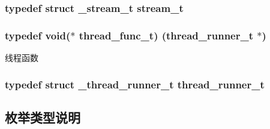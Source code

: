 \subsubsection[{stream\+\_\+t}]{\setlength{\rightskip}{0pt plus 5cm}typedef struct {\bf \+\_\+stream\+\_\+t} {\bf stream\+\_\+t}}\label{a00044_a261dba04f46f5c59a68a05f69f5a65a8_a261dba04f46f5c59a68a05f69f5a65a8}
\hypertarget{a00044_a46bcd8005e5d86fdbc6be5af0a77156c_a46bcd8005e5d86fdbc6be5af0a77156c}{}
\subsubsection[{thread\+\_\+func\+\_\+t}]{\setlength{\rightskip}{0pt plus 5cm}typedef void($\ast$ thread\+\_\+func\+\_\+t) ({\bf thread\+\_\+runner\+\_\+t} $\ast$)}\label{a00044_a46bcd8005e5d86fdbc6be5af0a77156c_a46bcd8005e5d86fdbc6be5af0a77156c}
线程函数 \hypertarget{a00044_a9054159cde2f926ef61c28ce1e555199_a9054159cde2f926ef61c28ce1e555199}{}
\subsubsection[{thread\+\_\+runner\+\_\+t}]{\setlength{\rightskip}{0pt plus 5cm}typedef struct {\bf \+\_\+thread\+\_\+runner\+\_\+t} {\bf thread\+\_\+runner\+\_\+t}}\label{a00044_a9054159cde2f926ef61c28ce1e555199_a9054159cde2f926ef61c28ce1e555199}


\subsection{枚举类型说明}
\hypertarget{a00044_a2217ac7363dbae279d056a361d122915_a2217ac7363dbae279d056a361d122915}{}
